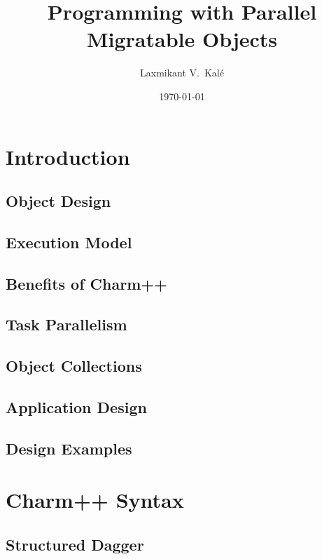 \documentclass{beamer}
\title[Parallel Migratable Objects]{Programming with Parallel Migratable Objects}
\institute[UIUC]{Parallel Programming Laboratory \\University of Illinois Urbana-Champaign}
\author{Laxmikant V.~Kal\'e}
\date{\today}
\begin{document}
\frame{\titlepage}

\section[Concepts]{Introduction}

\subsection[Object Design]{Object Design}
\subsection[Execution Mode]{Execution Model}

\subsection[Benefits]{Benefits of Charm++}

\subsection[Task Parallelism]{Task Parallelism}
%
\subsection[Collections]{Object Collections}

\subsection[Application Design]{Application Design}


\subsection[Design Examples]{Design Examples}

\section[Charm++]{Charm++ Syntax}
\subsection[Charm++]{Structured Dagger}

\end{document}
